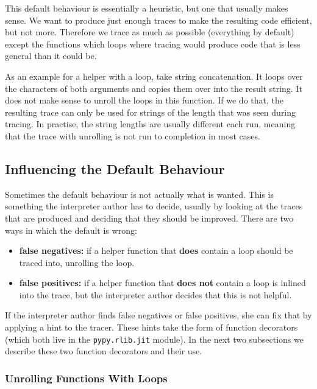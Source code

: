 \documentclass{sig-alternate}
\begin{document}
This default behaviour is essentially a heuristic, but one that usually makes
sense. We want to produce just enough traces to make the resulting code
efficient, but not more. Therefore we trace as much as possible (everything by
default) except the functions which loops where tracing would produce code that
is less general than it could be.

As an example for a helper with a loop, take string concatenation. It loops over
the characters of both arguments and copies them over into the result string. It
does not make sense to unroll the loops in this function. If we do that,
the resulting trace can only be used for strings of the length that was seen
during tracing. In practise, the string lengths are usually different each run,
meaning that the trace with unrolling is not run to completion in most cases.


\subsection{Influencing the Default Behaviour}

Sometimes the default behaviour is not actually what is wanted. This is
something the interpreter author has to decide, usually by looking at the traces
that are produced and deciding that they should be improved. There are two ways
in which the default is wrong:
%
\begin{itemize}

\item \textbf{false negatives:} if a helper function that \textbf{does} contain a loop should
be traced into, unrolling the loop.

\item \textbf{false positives:} if a helper function that \textbf{does not} contain a loop is
inlined into the trace, but the interpreter author decides that this is not
helpful.

\end{itemize}

If the interpreter author finds false negatives or false positives, she can fix
that by applying a hint to the tracer. These hints take the form of function
decorators (which both live in the \Verb|pypy.rlib.jit| module). In the next two
subsections we describe these two function decorators and their use.


\subsubsection{Unrolling Functions With Loops}
\end{document}

